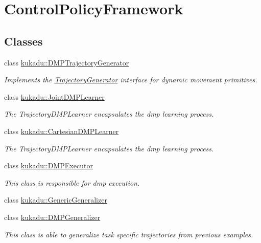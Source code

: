 \hypertarget{group__ControlPolicyFramework}{}\section{Control\+Policy\+Framework}
\label{group__ControlPolicyFramework}
\subsection*{Classes}
\begin{DoxyCompactItemize}
\item 
class \hyperlink{classkukadu_1_1DMPTrajectoryGenerator}{kukadu\+::\+D\+M\+P\+Trajectory\+Generator}
\begin{DoxyCompactList}\small\item\em Implements the \hyperlink{classkukadu_1_1TrajectoryGenerator}{Trajectory\+Generator} interface for dynamic movement primitives. \end{DoxyCompactList}\item 
class \hyperlink{classkukadu_1_1JointDMPLearner}{kukadu\+::\+Joint\+D\+M\+P\+Learner}
\begin{DoxyCompactList}\small\item\em The Trajectory\+D\+M\+P\+Learner encapsulates the dmp learning process. \end{DoxyCompactList}\item 
class \hyperlink{classkukadu_1_1CartesianDMPLearner}{kukadu\+::\+Cartesian\+D\+M\+P\+Learner}
\begin{DoxyCompactList}\small\item\em The Trajectory\+D\+M\+P\+Learner encapsulates the dmp learning process. \end{DoxyCompactList}\item 
class \hyperlink{classkukadu_1_1DMPExecutor}{kukadu\+::\+D\+M\+P\+Executor}
\begin{DoxyCompactList}\small\item\em This class is responsible for dmp execution. \end{DoxyCompactList}\item 
class \hyperlink{classkukadu_1_1GenericGeneralizer}{kukadu\+::\+Generic\+Generalizer}
\item 
class \hyperlink{classkukadu_1_1DMPGeneralizer}{kukadu\+::\+D\+M\+P\+Generalizer}
\begin{DoxyCompactList}\small\item\em This class is able to generalize task specific trajectories from previous examples. \end{DoxyCompactList}\item 

\end{DoxyCompactItemize}
